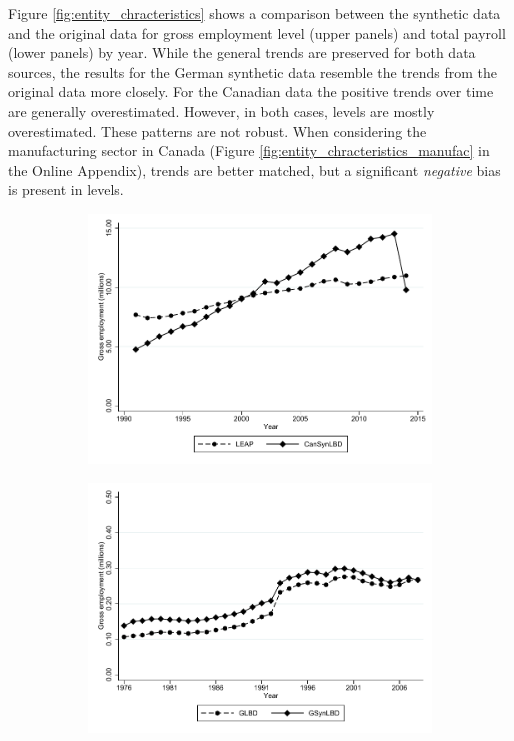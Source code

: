 \documentclass[10pt,twoside]{article}
\begin{document}
 
Figure \ref{fig:entity_chracteristics} shows a comparison between the synthetic data and the original data for gross employment level (upper panels) and total payroll (lower panels) by year. While the general trends are preserved for both data sources, the results for the German synthetic data resemble the trends from the original data more closely. For the Canadian data the positive trends over time are generally overestimated. However, in both cases, levels are mostly overestimated. These patterns are not robust. When considering the   manufacturing sector in Canada (Figure \ref{fig:entity_chracteristics_manufac} in the Online Appendix), trends are better matched, but a significant \textit{negative} bias is present in levels.
\begin{figure}[t]
  \begin{subfigure}[h]{0.48\linewidth}
    \includegraphics[trim=0 40 0 0,clip, width=\linewidth]{graphs/Gross_employment_level_by_year_private_bw.pdf}
  \end{subfigure}
\hfill
  \begin{subfigure}[h]{0.48\linewidth}
     \includegraphics[trim=0 40 0 0,clip,width=\linewidth]{graphs/Gross_employment_level_by_year_bw_GsynLBD.pdf}

\end{subfigure}
\end{figure}
\end{document}
